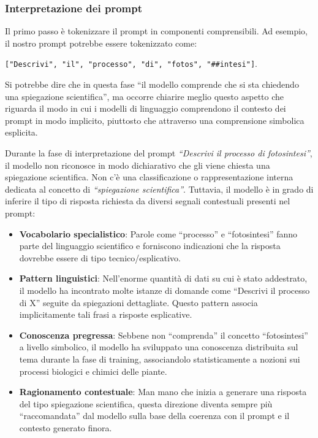         \subsubsection{Interpretazione dei prompt}
            Il primo passo è tokenizzare il prompt in componenti comprensibili. Ad esempio, il nostro prompt potrebbe essere tokenizzato come:

            \texttt{["Descrivi", "il", "processo", "di", "fotos", "\#\#intesi"]}.
            
            Si potrebbe dire che in questa fase ``il modello comprende che si sta chiedendo una spiegazione scientifica'', ma occorre chiarire meglio questo aspetto che riguarda il modo in cui i modelli di linguaggio comprendono il contesto dei prompt in modo implicito, piuttosto che attraverso una comprensione simbolica esplicita.
            
            Durante la fase di interpretazione del prompt \textit{``Descrivi il processo di fotosintesi''}, il modello non riconosce in modo dichiarativo che gli viene chiesta una spiegazione scientifica. Non c'è una classificazione o rappresentazione interna dedicata al concetto di \textit{``spiegazione scientifica''}. Tuttavia, il modello è in grado di inferire il tipo di risposta richiesta da diversi segnali contestuali presenti nel prompt:
            \begin{itemize}
                \item \textbf{Vocabolario specialistico}: Parole come ``processo'' e ``fotosintesi'' fanno parte del linguaggio scientifico e forniscono indicazioni che la risposta dovrebbe essere di tipo tecnico/esplicativo.
            
                \item \textbf{Pattern linguistici}: Nell'enorme quantità di dati su cui è stato addestrato, il modello ha incontrato molte istanze di domande come ``Descrivi il processo di X'' seguite da spiegazioni dettagliate. Questo pattern associa implicitamente tali frasi a risposte esplicative.
            
                \item \textbf{Conoscenza pregressa}: Sebbene non ``comprenda'' il concetto ``fotosintesi'' a livello simbolico, il modello ha sviluppato una conoscenza distribuita sul tema durante la fase di training, associandolo statisticamente a nozioni sui processi biologici e chimici delle piante.
            
                \item \textbf{Ragionamento contestuale}: Man mano che inizia a generare una risposta del tipo spiegazione scientifica, questa direzione diventa sempre più ``raccomandata'' dal modello sulla base della coerenza con il prompt e il contesto generato finora.
            \end{itemize}
            
